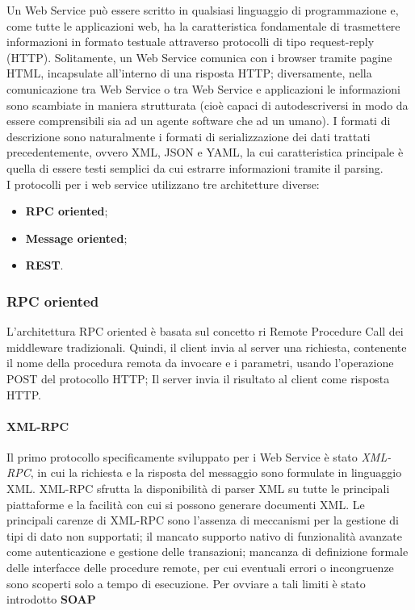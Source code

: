 Un Web Service può essere scritto in qualsiasi linguaggio di programmazione e, come tutte le applicazioni web, ha la caratteristica fondamentale di trasmettere informazioni in formato testuale attraverso protocolli di tipo request-reply (HTTP).
Solitamente, un Web Service comunica con i browser tramite pagine HTML, incapsulate all'interno di una risposta HTTP; diversamente, nella comunicazione tra Web Service o tra Web Service e applicazioni le informazioni sono scambiate in maniera strutturata (cioè capaci di autodescriversi in modo da essere comprensibili sia ad un agente software che ad un umano).
I formati di descrizione sono naturalmente i formati di serializzazione dei dati trattati precedentemente, ovvero XML, JSON e YAML, la cui caratteristica principale è quella di essere testi semplici da cui estrarre informazioni tramite il parsing.\\
I protocolli per i web service utilizzano tre architetture diverse:
\begin{itemize}
\item \textbf{RPC oriented};
\item \textbf{Message oriented};
\item \textbf{REST}.
\end{itemize}
\subsubsection{RPC oriented}
L'architettura RPC oriented è basata sul concetto ri Remote Procedure Call dei middleware tradizionali.
Quindi, il client invia al server una richiesta, contenente il nome della procedura remota da invocare e i parametri, usando l'operazione POST del protocollo HTTP; Il server invia il risultato al client come risposta HTTP.
\paragraph{XML-RPC}
Il primo protocollo specificamente sviluppato per i Web Service è stato \textit{XML-RPC}, in cui la richiesta e la risposta del messaggio sono formulate in linguaggio XML.
XML-RPC sfrutta la disponibilità di parser XML su tutte le principali piattaforme e la facilità con cui si possono generare documenti XML.
Le principali carenze di XML-RPC sono l'assenza di meccanismi per la gestione di tipi di dato non supportati; il mancato supporto nativo di funzionalità avanzate come autenticazione e gestione delle transazioni; mancanza di definizione formale delle interfacce delle procedure remote, per cui eventuali errori o incongruenze sono scoperti solo a tempo di esecuzione.
Per ovviare a tali limiti è stato introdotto \textbf{SOAP}
